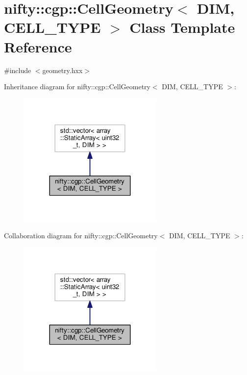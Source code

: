 \hypertarget{classnifty_1_1cgp_1_1CellGeometry}{}\section{nifty\+:\+:cgp\+:\+:Cell\+Geometry$<$ D\+I\+M, C\+E\+L\+L\+\_\+\+T\+Y\+P\+E $>$ Class Template Reference}
\label{classnifty_1_1cgp_1_1CellGeometry}


{\ttfamily \#include $<$geometry.\+hxx$>$}



Inheritance diagram for nifty\+:\+:cgp\+:\+:Cell\+Geometry$<$ D\+I\+M, C\+E\+L\+L\+\_\+\+T\+Y\+P\+E $>$\+:\nopagebreak
\begin{figure}[H]
\begin{center}
\leavevmode
\includegraphics[width=203pt]{classnifty_1_1cgp_1_1CellGeometry__inherit__graph}
\end{center}
\end{figure}


Collaboration diagram for nifty\+:\+:cgp\+:\+:Cell\+Geometry$<$ D\+I\+M, C\+E\+L\+L\+\_\+\+T\+Y\+P\+E $>$\+:\nopagebreak
\begin{figure}[H]
\begin{center}
\leavevmode
\includegraphics[width=203pt]{classnifty_1_1cgp_1_1CellGeometry__coll__graph}
\end{center}
\end{figure}
